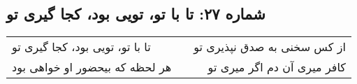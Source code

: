 \begin{center}
\section*{شماره ۲۷: تا با تو، تویی بود، کجا گیری تو}
\label{sec:027}
\begin{longtable}{l p{0.5cm} r}
تا با تو، تویی بود، کجا گیری تو
&&
از کس سخنی به صدق نپذیری تو
\\
هر لحظه که بیحضور او خواهی بود
&&
کافر میری آن دم اگر میری تو
\\
\end{longtable}
\end{center}
